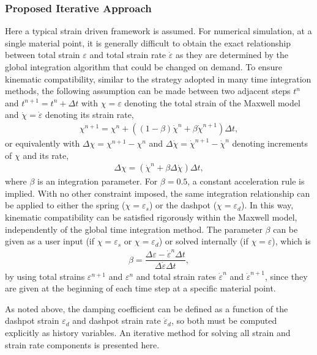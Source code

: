 \subsubsection{Proposed Iterative Approach}
Here a typical strain driven framework is assumed.
For numerical simulation, at a single material point, it is generally difficult to obtain the exact relationship between total strain $\varepsilon$ and total strain rate $\dot\varepsilon$ as they are determined by the global integration algorithm that could be changed on demand.
To ensure kinematic compatibility, similar to the strategy adopted in many time integration methods, the following assumption can be made between two adjacent steps $t^n$ and $t^{n+1}=t^n+\Delta{}t$ with $\chi=\varepsilon$ denoting the total strain of the Maxwell model and $\dot\chi=\dot\varepsilon$ denoting its strain rate,
\begin{gather}
\chi^{n+1}=\chi^n+\left(\left(1-\beta\right)\dot\chi^n+\beta\dot\chi^{n+1}\right)\Delta{}t,
\end{gather}
or equivalently with $\Delta\chi=\chi^{n+1}-\chi^n$ and $\Delta\dot\chi=\dot\chi^{n+1}-\dot\chi^n$ denoting increments of $\chi$ and its rate,
\begin{gather}\label{eq:newmark2}
\Delta\chi=\left(\dot\chi^n+\beta\Delta\dot\chi\right)\Delta{}t,
\end{gather}
where $\beta$ is an integration parameter.
For $\beta=0.5$, a constant acceleration rule is implied.
With no other constraint imposed, the same integration relationship can be applied to either the spring ($\chi=\varepsilon_s$) or the dashpot ($\chi=\varepsilon_d$).
In this way, kinematic compatibility can be satisfied rigorously within the Maxwell model, independently of the global time integration method.
The parameter $\beta$ can be given as a user input (if $\chi=\varepsilon_s$ or $\chi=\varepsilon_d$) or solved internally (if $\chi=\varepsilon$), which is
\begin{gather}\label{eq:delta}
\beta=\dfrac{\Delta\varepsilon-\dot\varepsilon^n\Delta{}t}{\Delta\dot\varepsilon\Delta{}t},
\end{gather}
by using total strains $\varepsilon^{n+1}$ and $\varepsilon^n$ and total strain rates $\dot\varepsilon^n$ and $\dot\varepsilon^{n+1}$, since they are given at the beginning of each time step at a specific material point.

As noted above, the damping coefficient can be defined as a function of the dashpot strain $\varepsilon_d$ and dashpot strain rate $\dot\varepsilon_d$, so both must be computed explicitly as history variables.
An iterative method for solving all strain and strain rate components is presented here.

